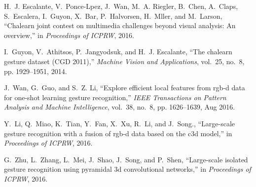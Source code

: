 \documentclass[10pt, a4paper, conference]{IEEEtran}
\begin{document}
\begin{thebibliography}{10}
H.~J. Escalante, V.~Ponce-Lpez, J.~Wan, M.~A. Riegler, B.~Chen, A.~Claps,
  S.~Escalera, I.~Guyon, X.~Bar, P.~Halvorsen, H.~Mller, and M.~Larson,
  ``Chalearn joint contest on multimedia challenges beyond visual analysis: An
  overview,'' in \emph{Proceedings of ICPRW}, 2016.

I.~Guyon, V.~Athitsos, P.~Jangyodsuk, and H.~J. Escalante, ``The chalearn
  gesture dataset ({CGD} 2011),'' \emph{Machine Vision and Applications},
  vol.~25, no.~8, pp. 1929--1951, 2014.

J.~Wan, G.~Guo, and S.~Z. Li, ``Explore efficient local features from rgb-d
  data for one-shot learning gesture recognition,'' \emph{IEEE Transactions on
  Pattern Analysis and Machine Intelligence}, vol.~38, no.~8, pp. 1626--1639,
  Aug 2016.

Y.~Li, Q.~Miao, K.~Tian, Y.~Fan, X.~Xu, R.~Li, and J.~Song., ``Large-scale
  gesture recognition with a fusion of rgb-d data based on the c3d model,'' in
  \emph{Proceedings of ICPRW}, 2016.

G.~Zhu, L.~Zhang, L.~Mei, J.~Shao, J.~Song, and P.~Shen, ``Large-scale isolated
  gesture recognition using pyramidal 3d convolutional networks,'' in
  \emph{Proceedings of ICPRW}, 2016.

\end{thebibliography}
\end{document}
